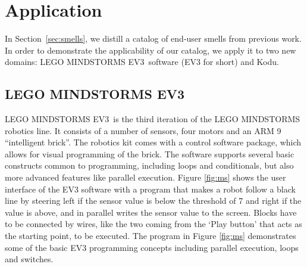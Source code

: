 \documentclass{sig-alternate}
\newcommand{\todo}[1]{\textbf{TODO: #1}}
\newcommand{\ms}{LEGO MINDSTORMS EV3}
\begin{document}



\section{Application}
\label{sec:application}
In Section~\ref{sec:smells}, we distill a catalog of end-user smells from previous work. In order to demonstrate the applicability of our catalog, we apply it to two new domains: \ms~software (EV3 for short) and  Kodu. 

\subsection{\ms}
\ms~is the third iteration of the LEGO MINDSTORMS robotics line. It consists of a number of sensors, four motors and an ARM 9 ``intelligent brick''. The robotics kit comes with a control software package, which allows for visual programming of the brick. The software supports several basic constructs common to programming, including loops and conditionals, but also more advanced features like parallel execution. Figure \ref{fig:ms} shows the user interface of the EV3 software with a program that makes a robot follow a black line by steering left if the sensor value is below the threshold of 7 and right if the value is above, and in parallel writes the sensor value to the screen. Blocks have to be connected by wires, like the two coming from the `Play button' that acts as the starting point, to be executed. The program in Figure \ref{fig:ms} demonstrates some of the basic EV3 programming concepts including parallel execution, loops and switches.
\end{document}
